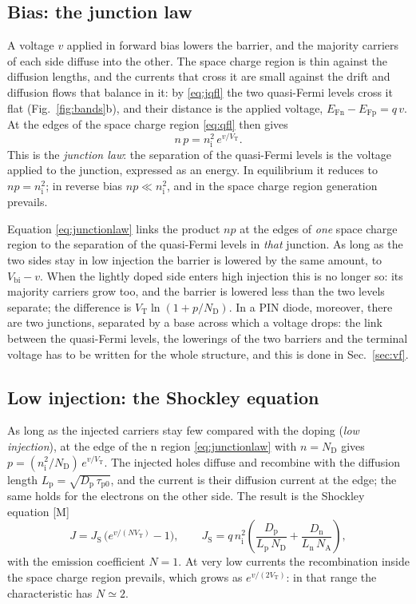 \documentclass[10pt,a4paper]{scrartcl}
\newcommand{\VT}{V_\mathrm{T}}
\newcommand{\Nem}{N}                          %
\newcommand{\ND}{N_\mathrm{D}}
\newcommand{\NA}{N_\mathrm{A}}
\newcommand{\nint}{n_\mathrm{i}}
\newcommand{\Dn}{D_\mathrm{n}}
\newcommand{\Dp}{D_\mathrm{p}}
\newcommand{\Vbi}{V_\mathrm{bi}}
\newcommand{\EFn}{E_\mathrm{Fn}}
\newcommand{\EFp}{E_\mathrm{Fp}}
\begin{document}
\subsection{Bias: the junction law}
\label{sec:bias}
A voltage $v$ applied in forward bias lowers the barrier, and the majority carriers of each side diffuse into the other. The space charge region is thin against the diffusion lengths, and the currents that cross it are small against the drift and diffusion flows that balance in it: by \eqref{eq:jqfl} the two quasi-Fermi levels cross it flat (Fig.~\ref{fig:bands}b), and their distance is the applied voltage, $\EFn - \EFp = q\,v$. At the edges of the space charge region \eqref{eq:qfl} then gives
\begin{equation}
n\,p = \nint^2\,e^{v/\VT} .
\label{eq:junctionlaw}
\end{equation}
This is the \emph{junction law}: the separation of the quasi-Fermi levels is the voltage applied to the junction, expressed as an energy. In equilibrium it reduces to $np = \nint^2$; in reverse bias $np \ll \nint^2$, and in the space charge region generation prevails.

Equation \eqref{eq:junctionlaw} links the product $np$ at the edges of \emph{one} space charge region to the separation of the quasi-Fermi levels in \emph{that} junction. As long as the two sides stay in low injection the barrier is lowered by the same amount, to $\Vbi - v$. When the lightly doped side enters high injection this is no longer so: its majority carriers grow too, and the barrier is lowered less than the two levels separate; the difference is $\VT\ln(1+p/\ND)$. In a PIN diode, moreover, there are two junctions, separated by a base across which a voltage drops: the link between the quasi-Fermi levels, the lowerings of the two barriers and the terminal voltage has to be written for the whole structure, and this is done in Sec.~\ref{sec:vf}.

\subsection{Low injection: the Shockley equation}
\label{sec:shockley}
As long as the injected carriers stay few compared with the doping (\emph{low injection}), at the edge of the n region \eqref{eq:junctionlaw} with $n = \ND$ gives $p = (\nint^2/\ND)\,e^{v/\VT}$. The injected holes diffuse and recombine with the diffusion length $L_\mathrm{p} = \sqrt{\Dp\,\tau_\mathrm{p0}}$, and the current is their diffusion current at the edge; the same holds for the electrons on the other side. The result is the Shockley equation [M]~\cite{sze}
\begin{equation}
J = J_\mathrm{S}\,\bigl(e^{v/(\Nem\VT)} - 1\bigr) , \qquad
J_\mathrm{S} = q\,\nint^2\left(\frac{\Dp}{L_\mathrm{p}\,\ND} + \frac{\Dn}{L_\mathrm{n}\,\NA}\right) ,
\label{eq:shockley}
\end{equation}
with the emission coefficient $\Nem = 1$. At very low currents the recombination inside the space charge region prevails, which grows as $e^{v/(2\VT)}$: in that range the characteristic has $\Nem \simeq 2$.
\end{document}
